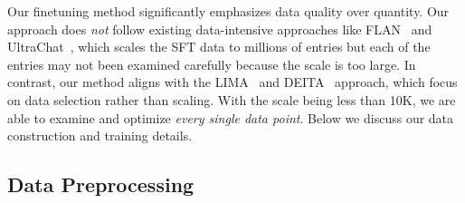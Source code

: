 

Our finetuning method significantly emphasizes data quality over quantity.
Our approach does \textit{not} follow existing data-intensive approaches like FLAN~\citep{chung2022scaling} and UltraChat~\citep{ding2023enhancing}, which scales the SFT data to millions of entries but each of the entries may not been examined carefully because the scale is too large.
In contrast, our method aligns with the LIMA~\citep{zhou2023lima} and DEITA~\citep{liu2023makes} approach, which focus on data selection rather than scaling. 
With the scale being less than 10K, we are able to examine and optimize \textit{every single data point}. 
Below we discuss our data construction and training details. 


\subsection{Data Preprocessing}

